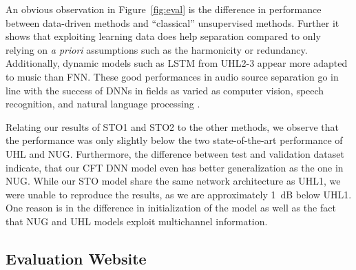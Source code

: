 An obvious observation in Figure~\ref{fig:eval} is the difference in performance between data-driven methods and ``classical'' unsupervised methods. 
Further it shows that exploiting learning data does help separation compared to only relying on \textit{a priori} assumptions such as the harmonicity or redundancy. Additionally, dynamic models such as LSTM from UHL2-3 appear more adapted to music than FNN. 
These good performances in audio source separation go in line with the success of DNNs in fields as varied as computer vision, speech recognition, and natural language processing \cite{lecun15}.
\par
Relating our results of STO1 and STO2 to the other methods, we observe that the performance was only slightly below the two state-of-the-art performance of UHL and NUG.
Furthermore, the difference between test and validation dataset indicate, that our CFT DNN model even has better generalization as the one in NUG. 
While our STO model share the same network architecture as UHL1, we were unable to reproduce the results, as we are approximately 1~dB below UHL1.
One reason is in the difference in initialization of the model as well as the fact that NUG and UHL models exploit multichannel information. 

\subsection{Evaluation Website}
\label{ssec:evaluation Website}

